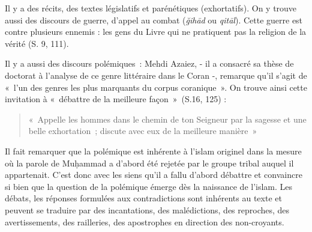 Il y a des récits, des textes législatifs et parénétiques (exhortatifs).
On y trouve aussi des discours de guerre, d'appel au combat
(\emph{ğihād} ou \emph{qitāl}). Cette
guerre est contre plusieurs ennemis : les gens du Livre qui ne
pratiquent pas la religion de la vérité (S. 9, 111).

Il y a aussi des discours polémiques~: Mehdi Azaiez, - il a consacré sa
thèse de doctorat à l'analyse de ce genre littéraire dans le Coran -,
remarque qu'il s'agit de «~l'un des genres les plus marquants du corpus
coranique~». On
trouve ainsi cette invitation à «~débattre de la meilleure
façon~»~(S.16, 125) :
\begin{quote}
    
«~Appelle les hommes dans le chemin de ton Seigneur par la sagesse et
une belle exhortation~; discute avec eux de la meilleure manière~»

\end{quote}

Il fait remarquer que la polémique est inhérente à l'islam originel dans
la mesure où la parole de Muḥammad a d'abord été rejetée par le groupe
tribal auquel il appartenait. C'est donc avec les siens qu'il a fallu
d'abord débattre et convaincre si bien que la question de la polémique
émerge dès la naissance de l'islam. Les débats, les réponses formulées
aux contradictions sont inhérents au texte et peuvent se traduire par
des incantations, des malédictions, des reproches, des avertissements,
des railleries, des apostrophes en direction des
non-croyants.

